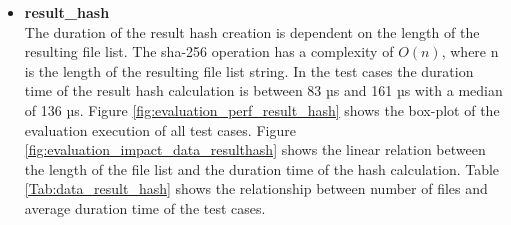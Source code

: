 \documentclass[draft,final]{vutinfth} %
\begin{document}
\begin{itemize}
\begin{figure}[!h]
\end{figure}
	\item \textbf{result\_hash} \\
	The duration of the result hash creation is dependent on the length of the resulting file list. The sha-256 operation has a complexity of $O(n)$, where n is the length of the resulting file list string. In the test cases the duration time of the result hash calculation is between 83 µs and 161 µs with a median of 136 µs. Figure \ref{fig:evaluation_perf_result_hash} shows the box-plot of the evaluation execution of all test cases. Figure \ref{fig:evaluation_impact_data_resulthash} shows the linear relation between the length of the file list and the duration time of the hash calculation. Table \ref{Tab:data_result_hash} shows the relationship between number of files and average duration time of the test cases.  
	

\end{itemize}
\end{document}
